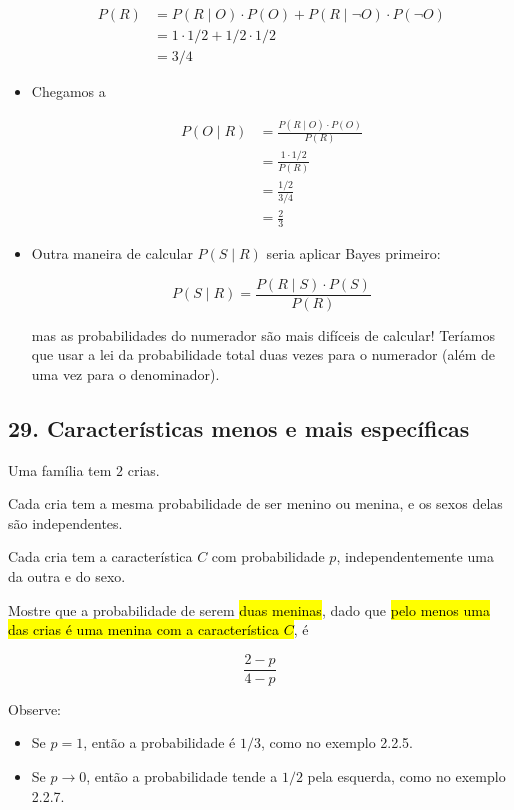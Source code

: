 \documentclass[
  11pt]{report}
\begin{document}
\begin{itemize}
  \[
  \begin{aligned}
  P(R) 
  &= P(R \mid O) \cdot P(O) + P(R \mid \neg O) \cdot P(\neg O) \\
  &= 1 \cdot 1/2 + 1/2 \cdot 1/2 \\
  &= 3/4
  \end{aligned}
  \]
\item
  Chegamos a

  \[
  \begin{aligned}
  P(O \mid R) 
  &= \frac{P(R \mid O) \cdot P(O)}{P(R)} \\
  &= \frac{1 \cdot 1/2}{P(R)} \\
  &= \frac{1/2}{3/4} \\
  &= \frac{2}{3}
  \end{aligned}
  \]
\item
  Outra maneira de calcular $P(S \mid R)$ seria aplicar Bayes primeiro:

  \[
  P(S \mid R) = \frac{P(R \mid S) \cdot P(S)}{P(R)}
  \]

  mas as probabilidades do numerador são mais difíceis de calcular! Teríamos que usar a lei da probabilidade total duas vezes para o numerador (além de uma vez para o denominador).
\end{itemize}

\hypertarget{caracteruxedsticas-menos-e-mais-especuxedficas}{%
\subsection*{29. Características menos e mais específicas}\label{caracteruxedsticas-menos-e-mais-especuxedficas}}

\begin{rmdbox}

Uma família tem $2$ crias.

Cada cria tem a mesma probabilidade de ser menino ou menina, e os sexos delas são independentes.

Cada cria tem a característica $C$ com probabilidade $p$, independentemente uma da outra e do sexo.

Mostre que a probabilidade de serem {\hl{duas meninas}}, dado que {\hl{pelo menos uma das crias é uma menina com a característica $C$}}, é

\[
\frac{2 - p}{4 - p}
\]

Observe:

\begin{itemize}
\item
  Se $p = 1$, então a probabilidade é $1/3$, como no exemplo 2.2.5.
\item
  Se $p \to 0$, então a probabilidade tende a $1/2$ pela esquerda, como no exemplo 2.2.7.
\end{itemize}

\end{rmdbox}
\end{document}
